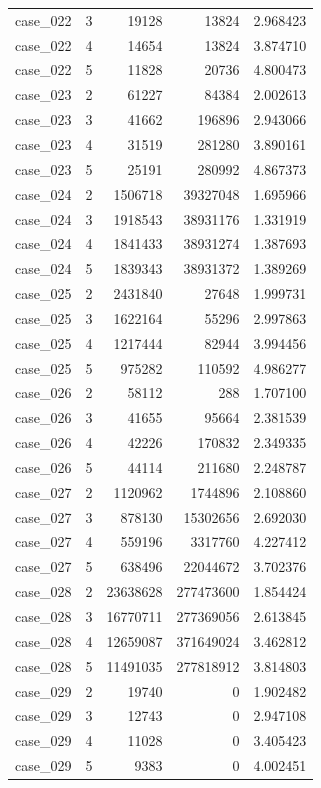 \begin{longtable}{lrrrr}
case\_022 & 3 & 19128 & 13824 & 2.968423 \\
case\_022 & 4 & 14654 & 13824 & 3.874710 \\
case\_022 & 5 & 11828 & 20736 & 4.800473 \\
case\_023 & 2 & 61227 & 84384 & 2.002613 \\
case\_023 & 3 & 41662 & 196896 & 2.943066 \\
case\_023 & 4 & 31519 & 281280 & 3.890161 \\
case\_023 & 5 & 25191 & 280992 & 4.867373 \\
case\_024 & 2 & 1506718 & 39327048 & 1.695966 \\
case\_024 & 3 & 1918543 & 38931176 & 1.331919 \\
case\_024 & 4 & 1841433 & 38931274 & 1.387693 \\
case\_024 & 5 & 1839343 & 38931372 & 1.389269 \\
case\_025 & 2 & 2431840 & 27648 & 1.999731 \\
case\_025 & 3 & 1622164 & 55296 & 2.997863 \\
case\_025 & 4 & 1217444 & 82944 & 3.994456 \\
case\_025 & 5 & 975282 & 110592 & 4.986277 \\
case\_026 & 2 & 58112 & 288 & 1.707100 \\
case\_026 & 3 & 41655 & 95664 & 2.381539 \\
case\_026 & 4 & 42226 & 170832 & 2.349335 \\
case\_026 & 5 & 44114 & 211680 & 2.248787 \\
case\_027 & 2 & 1120962 & 1744896 & 2.108860 \\
case\_027 & 3 & 878130 & 15302656 & 2.692030 \\
case\_027 & 4 & 559196 & 3317760 & 4.227412 \\
case\_027 & 5 & 638496 & 22044672 & 3.702376 \\
case\_028 & 2 & 23638628 & 277473600 & 1.854424 \\
case\_028 & 3 & 16770711 & 277369056 & 2.613845 \\
case\_028 & 4 & 12659087 & 371649024 & 3.462812 \\
case\_028 & 5 & 11491035 & 277818912 & 3.814803 \\
case\_029 & 2 & 19740 & 0 & 1.902482 \\
case\_029 & 3 & 12743 & 0 & 2.947108 \\
case\_029 & 4 & 11028 & 0 & 3.405423 \\
case\_029 & 5 & 9383 & 0 & 4.002451 \\

\end{longtable}
